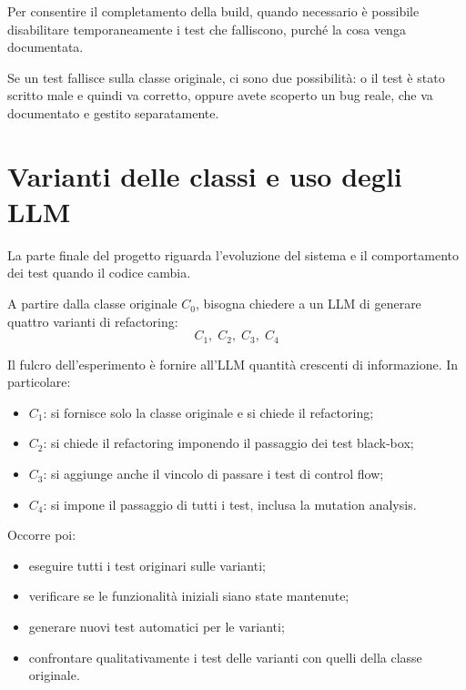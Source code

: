\begin{notaslide}
Per consentire il completamento della build, quando necessario è possibile disabilitare temporaneamente i test che falliscono, purché la cosa venga documentata.
\end{notaslide}

\begin{notaprof}
Se un test fallisce sulla classe originale, ci sono due possibilità: o il test è stato scritto male e quindi va corretto, oppure avete scoperto un bug reale, che va documentato e gestito separatamente.
\end{notaprof}

\section{Varianti delle classi e uso degli LLM}

La parte finale del progetto riguarda l'evoluzione del sistema e il comportamento dei test quando il codice cambia.

A partire dalla classe originale \(C_0\), bisogna chiedere a un LLM di generare quattro varianti di refactoring:
\[
C_1,\; C_2,\; C_3,\; C_4
\]

\begin{notaprof}
Il fulcro dell'esperimento è fornire all'LLM quantità crescenti di informazione. In particolare:
\begin{itemize}
    \item \(C_1\): si fornisce solo la classe originale e si chiede il refactoring;
    \item \(C_2\): si chiede il refactoring imponendo il passaggio dei test black-box;
    \item \(C_3\): si aggiunge anche il vincolo di passare i test di control flow;
    \item \(C_4\): si impone il passaggio di tutti i test, inclusa la mutation analysis.
\end{itemize}
\end{notaprof}

Occorre poi:
\begin{itemize}
    \item eseguire tutti i test originari sulle varianti;
    \item verificare se le funzionalità iniziali siano state mantenute;
    \item generare nuovi test automatici per le varianti;
    \item confrontare qualitativamente i test delle varianti con quelli della classe originale.
\end{itemize}

